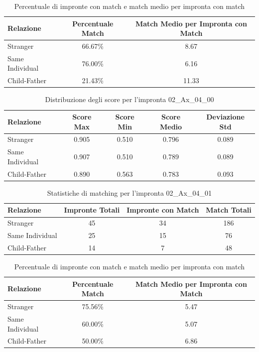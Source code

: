 \begin{table}[htbp]
\centering
\caption{Percentuale di impronte con match e match medio per impronta con match}
\label{tab:match_percentage_02_Ax_04_00}
\begin{tabular}{|l|c|c|}
\hline
\textbf{Relazione} & \textbf{Percentuale Match} & \textbf{Match Medio per Impronta con Match} \\
\hline
Stranger & 66.67\% & 8.67 \\
\hline
Same Individual & 76.00\% & 6.16 \\
\hline
Child-Father & 21.43\% & 11.33 \\
\hline
\end{tabular}
\end{table}


\begin{table}[htbp]
\centering
\caption{Distribuzione degli score per l'impronta 02\_Ax\_04\_00}
\label{tab:scores_02_Ax_04_00}
\begin{tabular}{|l|c|c|c|c|}
\hline
\textbf{Relazione} & \textbf{Score Max} & \textbf{Score Min} & \textbf{Score Medio} & \textbf{Deviazione Std} \\
\hline
Stranger & 0.905 & 0.510 & 0.796 & 0.089 \\
\hline
Same Individual & 0.907 & 0.510 & 0.789 & 0.089 \\
\hline
Child-Father & 0.890 & 0.563 & 0.783 & 0.093 \\
\hline
\end{tabular}
\end{table}


\begin{table}[htbp]
\centering
\caption{Statistiche di matching per l'impronta 02\_Ax\_04\_01}
\label{tab:results_02_Ax_04_01}
\begin{tabular}{|l|c|c|c|}
\hline
\textbf{Relazione} & \textbf{Impronte Totali} & \textbf{Impronte con Match} & \textbf{Match Totali} \\
\hline
Stranger & 45 & 34 & 186 \\
\hline
Same Individual & 25 & 15 & 76 \\
\hline
Child-Father & 14 & 7 & 48 \\
\hline
\end{tabular}
\end{table}


\begin{table}[htbp]
\centering
\caption{Percentuale di impronte con match e match medio per impronta con match}
\label{tab:match_percentage_02_Ax_04_01}
\begin{tabular}{|l|c|c|}
\hline
\textbf{Relazione} & \textbf{Percentuale Match} & \textbf{Match Medio per Impronta con Match} \\
\hline
Stranger & 75.56\% & 5.47 \\
\hline
Same Individual & 60.00\% & 5.07 \\
\hline
Child-Father & 50.00\% & 6.86 \\
\hline
\end{tabular}
\end{table}


